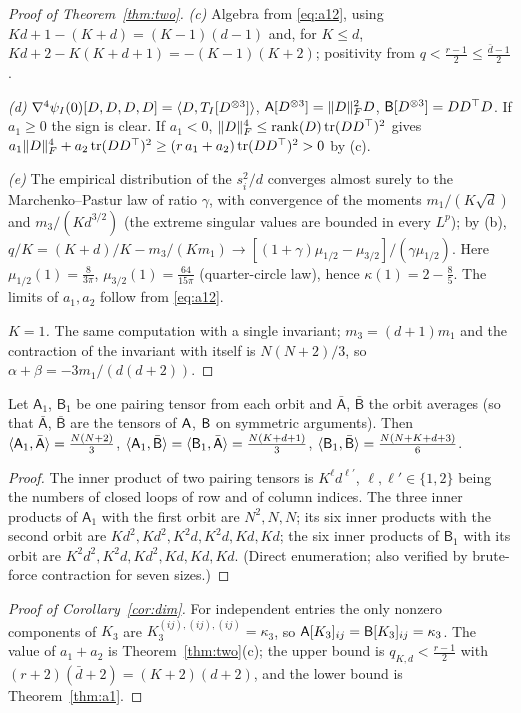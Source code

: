 \begin{proof}[Proof of Theorem~\ref{thm:two}]
\emph{(c)} Algebra from \eqref{eq:a12}, using $Kd+1-(K+d)=(K-1)(d-1)$ and, for $K\le d$,
$Kd+2-K(K+d+1)=-(K-1)(K+2)$; positivity from $q<\frac{r-1}2\le\frac{\bar d-1}2$.

\emph{(d)} $\nabla^4\psi_I(0)[D,D,D,D]=\langle D, T_I[D^{\otimes3}]\rangle$, $\mathsf{A}[D^{\otimes3}]=\|D\|_{F}^2D$,
$\mathsf{B}[D^{\otimes3}]=DD^\top D$. If $a_1\ge0$ the sign is clear. If $a_1<0$, $\|D\|_{F}^4\le\operatorname{rank}(D)\operatorname{tr}(DD^\top)^2$
gives $a_1\|D\|_{F}^4+a_2\operatorname{tr}(DD^\top)^2\ge(r\,a_1+a_2)\operatorname{tr}(DD^\top)^2>0$ by (c).

\emph{(e)} The empirical distribution of the $s_i^2/d$ converges almost surely to the Marchenko--Pastur law of ratio
$\gamma$, with convergence of the moments $m_1/(K\sqrt d)$ and $m_3/(Kd^{3/2})$ (the extreme singular values are bounded in
every $L^p$); by (b), $q/K=(K+d)/K-m_3/(Km_1)\to[(1+\gamma)\mu_{1/2}-\mu_{3/2}]/(\gamma\mu_{1/2})$. Here $\mu_{1/2}(1)=\frac8{3\pi}$, $\mu_{3/2}(1)=\frac{64}{15\pi}$
(quarter-circle law), hence $\kappa(1)=2-\frac85$. The limits of $a_1,a_2$ follow from \eqref{eq:a12}.

\emph{$K=1$.} The same computation with a single invariant; $m_3=(d+1)m_1$ and the contraction of the invariant with
itself is $N(N+2)/3$, so $\alpha+\beta=-3m_1/(d(d+2))$.
\end{proof}

\begin{lemma}[counting]\label{lem:count}
Let $\mathsf A_1$, $\mathsf B_1$ be one pairing tensor from each orbit and $\bar{\mathsf A}$, $\bar{\mathsf B}$ the orbit
averages (so that $\bar{\mathsf A}$, $\bar{\mathsf B}$ are the tensors of $\mathsf{A}$, $\mathsf{B}$ on symmetric arguments). Then
$\langle \mathsf A_1, \bar{\mathsf A}\rangle=\frac{N(N+2)}3$, $\langle \mathsf A_1, \bar{\mathsf B}\rangle=\langle \mathsf B_1, \bar{\mathsf A}\rangle=\frac{N(K+d+1)}3$,
$\langle \mathsf B_1, \bar{\mathsf B}\rangle=\frac{N(N+K+d+3)}6$.
\end{lemma}
\begin{proof}
The inner product of two pairing tensors is $K^{\ell}d^{\ell'}$, $\ell,\ell'\in\{1,2\}$ being the numbers of closed
loops of row and of column indices. The three inner products of $\mathsf A_1$ with the first orbit are $N^2,N,N$; its
six inner products with the second orbit are $Kd^2,Kd^2,K^2d,K^2d,Kd,Kd$; the six inner products of $\mathsf B_1$ with
its orbit are $K^2d^2,K^2d,Kd^2,Kd,Kd,Kd$. (Direct enumeration; also verified by brute-force contraction for seven sizes.)
\end{proof}

\begin{proof}[Proof of Corollary~\ref{cor:dim}]
For independent entries the only nonzero components of $K_3$ are $K_3^{(ij),(ij),(ij)}=\kappa_3$, so
$\mathsf{A}[K_3]_{ij}=\mathsf{B}[K_3]_{ij}=\kappa_3$. The value of $a_1+a_2$ is Theorem~\ref{thm:two}(c); the upper bound is
$q_{K,d}<\frac{r-1}2$ with $(r+2)(\bar d+2)=(K+2)(d+2)$, and the lower bound is Theorem~\ref{thm:a1}.
\end{proof}

